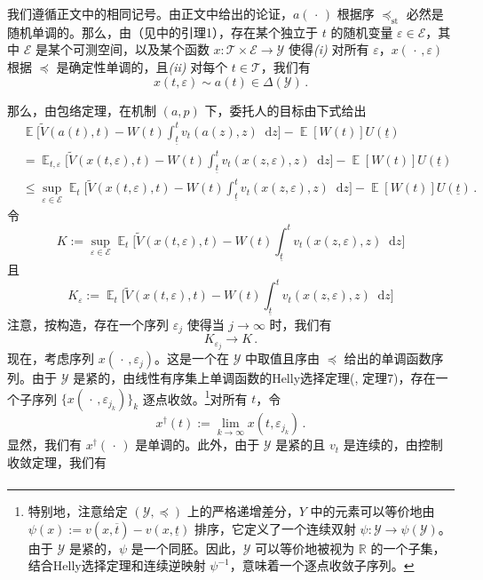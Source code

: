 \documentclass[12pt,letterpaper]{article}
\newenvironment{translation}{\color{blue}\noindent}{}
\theoremstyle{plain}
\theoremstyle{definition}
\theoremstyle{remark}
\DeclareMathOperator{\E}{\mathds{E}}
\newcommand{\R}{\mathds{R}}
\newcommand{\Y}{\mathcal{Y}}
\renewcommand{\1}{\mathds{1}}
\renewcommand{\epsilon}{\varepsilon}
\renewcommand*\d{\mathop{}\!\mathrm{d}}
\theoremstyle{definition}
\begin{document}
\begin{translation}
我们遵循正文中的相同记号。由正文中给出的论证，$a(\,\cdot\,)$ 根据序 $\preceq_{\text{st}}$ 必然是随机单调的。那么，由\citet{Strassen1965}（见\citealt{yang2022costly}中的引理1），存在某个独立于 $t$ 的随机变量 $\epsilon \in \mathcal{E}$，其中 $\mathcal{E}$ 是某个可测空间，以及某个函数 $x: \mathcal{T} \times  \mathcal{E} \rightarrow \Y$ 使得\textit{(i)} 对所有 $\epsilon$，$x(\,\cdot\,, \epsilon)$ 根据 $\preceq$ 是确定性单调的，且\textit{(ii)} 对每个 $t \in \mathcal{T}$，我们有
\[x(t, \epsilon) \sim  a(t) \in \Delta(\Y)\,. \]

那么，由包络定理，在机制 $(a, p)$ 下，委托人的目标由下式给出
\begin{align*}
&\E\Bigg[\widetilde{V}(a(t), t) - W(t) \int_{\underline{t}}^t v_t(a(z), z) \d z \Bigg] - \E[W(t)] U(\underline{t}) \\
&=\E_{t, \epsilon}\Bigg[\widetilde{V}(x(t, \varepsilon), t) - W(t) \int_{\underline{t}}^t v_t(x(z, \varepsilon), z) \d z \Bigg] - \E[W(t)] U(\underline{t}) \\
&\leq\sup_{\varepsilon \in \mathcal{E}}\E_{t}\Bigg[\widetilde{V}(x(t, \varepsilon), t) - W(t) \int_{\underline{t}}^t v_t(x(z, \varepsilon), z) \d z \Bigg] - \E[W(t)] U(\underline{t})\,.
\end{align*}
令
\[K:=\sup_{\varepsilon \in \mathcal{E}}\E_{t}\Bigg[\widetilde{V}(x(t, \varepsilon), t) - W(t) \int_{\underline{t}}^t v_t(x(z, \varepsilon), z) \d z \Bigg]\]
且
\[K_{\epsilon}:=\E_{t}\Bigg[\widetilde{V}(x(t, \varepsilon), t) - W(t) \int_{\underline{t}}^t v_t(x(z, \varepsilon), z) \d z \Bigg]\]
注意，按构造，存在一个序列 $\epsilon_j$ 使得当 $j\rightarrow \infty$ 时，我们有
\[K_{\epsilon_j} \rightarrow K\,.\]
现在，考虑序列 $x(\,\cdot\,, \epsilon_j)$。这是一个在 $\Y$ 中取值且序由 $\preceq$ 给出的单调函数序列。由于 $\Y$ 是紧的，由线性有序集上单调函数的Helly选择定理(\citealt{fuchino1999theorem}, 定理7)，存在一个子序列 $\{x(\,\cdot\,, \epsilon_{j_k})\}_k$ 逐点收敛。\footnote{特别地，注意给定 $(\Y, \preceq)$ 上的严格递增差分，$Y$ 中的元素可以等价地由 $\psi(x) := v(x, \overline{t}) - v(x, \underline{t})$ 排序，它定义了一个连续双射 $\psi: \Y \rightarrow \psi(\Y)$。由于 $\Y$ 是紧的，$\psi$ 是一个同胚。因此，$\Y$ 可以等价地被视为 $\R$ 的一个子集，结合Helly选择定理和连续逆映射 $\psi^{-1}$，意味着一个逐点收敛子序列。}对所有 $t$，令
\[x^\dagger(t):= \lim_{k\rightarrow\infty} x(t, \epsilon_{j_k})\,.\]
显然，我们有 $x^\dagger(\,\cdot\,)$ 是单调的。此外，由于 $\Y$ 是紧的且 $v_t$ 是连续的，由控制收敛定理，我们有
\begin{align*}

\end{align*}
\end{translation}
\end{document}
